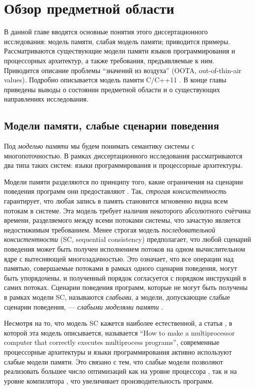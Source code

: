 \chapter{Обзор предметной области} \label{sec:overview}
В данной главе вводятся основные понятия этого диссертационного исследования: модель памяти, слабая модель памяти;
приводится примеры.
Рассматриваются существующие модели памяти языков программирования и
процессорных архитектур, а также требования, предъявляемые к ним.
Приводится описание проблемы ``значений из воздуха'' (OOTA, out-of-thin-air values).
Подробно описывается модель памяти C/C++11 \cite{Batty-al:POPL11}.
В конце главы приведены выводы о состоянии предметной области и о существующих
направлениях исследования.

\section{Модели памяти, слабые сценарии поведения}
Под \emph{моделью памяти} мы будем понимать семантику системы с многопоточностью.
В рамках диссертационного исследования рассматриваются два типа таких систем:
языки программирования и процессорные архитектуры.

Модели памяти разделяются по принципу того, какие ограничения на сценарии поведения
программ они предоставляют \cite{Kshemkalyani-Singhal:2011}.
Так, \emph{строгая консистентность} гарантирует, что любая запись в память становится мгновенно видна
всем потокам в системе. Эта модель требует наличия некоторого абсолютного счётчика времени, разделяемого
между всеми потоками системы,
что зачастую является недостижимым требованием. Менее строгая модель \emph{последовательной консистентности} \cite{Lamport:TC79}
(SC, sequential consistency)
предполагает, что любой сценарий поведения может быть получен исполнением потоков на одном вычислительном
ядре с вытесняющей многозадачностью. Это означает, что все операции над памятью, совершаемые потоками в рамках
одного сценария поведения,
могут быть упорядочены, и полученный порядок согласуется с порядком инструкций в самих потоках.
Сценарии поведения программ, которые не могут быть получены в рамках модели SC, называются
\emph{слабыми}, а модели, допускающие слабые сценарии поведения, --- \emph{слабыми моделями памяти} \cite{Adve-Gharachorloo:IEEE96}.

Несмотря на то, что модель SC кажется наиболее естественной, а статья \cite{Lamport:TC79},
в которой эта модель описывается, называется ``How to make a multiprocessor computer that correctly executes multiprocess programs'',
современные процессорные архитектуры и языки программирования активно используют слабые модели памяти. Это 
связано с тем, что слабые модели позволяют реализовать большее число оптимизаций как на уровне процессора
\cite{Hennessy-Patterson:BOOK}, так и на уровне компилятора \cite{Aho-al:BOOK86,Muchnick:BOOK97},
что увеличивает производительность программ.

